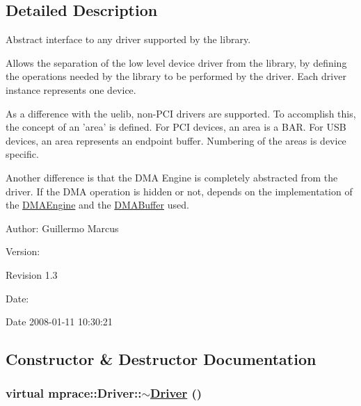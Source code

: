 \subsection{Detailed Description}
Abstract interface to any driver supported by the library. 

Allows the separation of the low level device driver from the library, by defining the operations needed by the library to be performed by the driver. Each driver instance represents one device.

As a difference with the uelib, non-PCI drivers are supported. To accomplish this, the concept of an 'area' is defined. For PCI devices, an area is a BAR. For USB devices, an area represents an endpoint buffer. Numbering of the areas is device specific.

Another difference is that the DMA Engine is completely abstracted from the driver. If the DMA operation is hidden or not, depends on the implementation of the \hyperlink{classmprace_1_1DMAEngine}{DMAEngine} and the \hyperlink{classmprace_1_1DMABuffer}{DMABuffer} used.

\begin{Desc}
\item[Author:]Guillermo Marcus \end{Desc}
\begin{Desc}
\item[Version:]\begin{Desc}
\item[Revision]1.3 \end{Desc}
\end{Desc}
\begin{Desc}
\item[Date:]\begin{Desc}
\item[Date]2008-01-11 10:30:21 \end{Desc}
\end{Desc}




\subsection{Constructor \& Destructor Documentation}
\hypertarget{classmprace_1_1Driver_a0}{
\subsubsection[$\sim$Driver]{\setlength{\rightskip}{0pt plus 5cm}virtual mprace::Driver::$\sim$\hyperlink{classmprace_1_1Driver}{Driver} ()}}
\label{classmprace_1_1Driver_a0}


